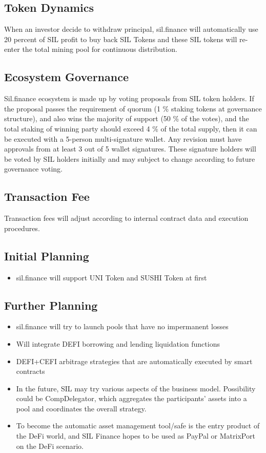 \documentclass[11pt,letterpaper]{article}
\begin{document}
\begin{multicols}{2}
\subsection{Token Dynamics}
When an investor decide to withdraw principal, sil.finance will automatically use 20 percent of SIL profit to buy back SIL Tokens and these SIL tokens will re-enter the total mining pool for continuous distribution.

\subsection{Ecosystem Governance}
Sil.finance ecosystem is made up by voting  proposals from SIL token holders. If the proposal passes the requirement of quorum (1 \% staking tokens at governance structure), and also wins the majority of support (50 \% of the votes), and the total staking of winning party should exceed 4 \% of the total supply, then it can be executed with a 5-person multi-signature wallet. Any revision must have approvals from at least 3 out of 5 wallet signatures. These signature holders will be voted by SIL holders initially and may subject to change according to future governance voting.

\subsection{Transaction Fee}
Transaction fees will adjust according to internal contract data and execution procedures.

\subsection{Initial Planning}
\begin{itemize}
  \item sil.finance will support UNI Token and SUSHI Token at first
\end{itemize}

\subsection{Further Planning}
\begin{itemize}
  \item sil.finance will try to launch pools that have no impermanent losses
  \item Will integrate DEFI borrowing and lending liquidation functions
  \item DEFI+CEFI arbitrage strategies that are automatically executed by smart contracts
  \item In the future, SIL may try various aspects of the business model. Possibility could be CompDelegator, which aggregates the participants’ assets into a pool and coordinates the overall strategy.
  \item To become the automatic asset management tool/safe is the entry product of the DeFi world, and SIL Finance hopes to be used as PayPal or MatrixPort on the DeFi scenario.
\end{itemize}


\end{multicols}
\end{document}
